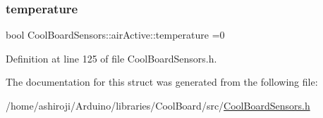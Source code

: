 \subsubsection{\texorpdfstring{temperature}{temperature}}
{\footnotesize\ttfamily bool Cool\+Board\+Sensors\+::air\+Active\+::temperature =0}



Definition at line 125 of file Cool\+Board\+Sensors.\+h.



The documentation for this struct was generated from the following file\+:\begin{DoxyCompactItemize}
\item 
/home/ashiroji/\+Arduino/libraries/\+Cool\+Board/src/\hyperlink{_cool_board_sensors_8h}{Cool\+Board\+Sensors.\+h}\end{DoxyCompactItemize}
